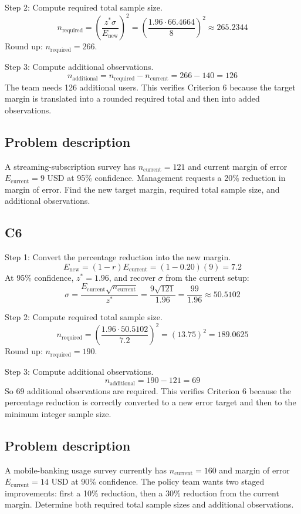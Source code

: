 \begin{ExamProblems}
		Step 2: Compute required total sample size.
		\[
		n_{\text{required}} = \left(\frac{z^*\sigma}{E_{\text{new}}}\right)^2
		= \left(\frac{1.96 \cdot 66.4664}{8}\right)^2
		\approx 265.2344
		\]
		Round up: $n_{\text{required}} = 266$.

		Step 3: Compute additional observations.
		\[
		n_{\text{additional}} = n_{\text{required}} - n_{\text{current}} = 266 - 140 = 126
		\]
		The team needs 126 additional users. This verifies Criterion 6 because the target margin is translated into a rounded required total and then into added observations.

		\item
		\subsection*{Problem description}
		A streaming-subscription survey has $n_{\text{current}} = 121$ and current margin of error $E_{\text{current}} = 9$ USD at 95\% confidence. Management requests a 20\% reduction in margin of error. Find the new target margin, required total sample size, and additional observations.

		\subsection*{C6}
		Step 1: Convert the percentage reduction into the new margin.
		\[
		E_{\text{new}} = (1-r)E_{\text{current}} = (1-0.20)(9) = 7.2
		\]
		At 95\% confidence, $z^* = 1.96$, and recover $\sigma$ from the current setup:
		\[
		\sigma = \frac{E_{\text{current}}\sqrt{n_{\text{current}}}}{z^*}
		= \frac{9\sqrt{121}}{1.96}
		= \frac{99}{1.96}
		\approx 50.5102
		\]

		Step 2: Compute required total sample size.
		\[
		n_{\text{required}} = \left(\frac{1.96 \cdot 50.5102}{7.2}\right)^2
		= \left(13.75\right)^2
		= 189.0625
		\]
		Round up: $n_{\text{required}} = 190$.

		Step 3: Compute additional observations.
		\[
		n_{\text{additional}} = 190 - 121 = 69
		\]
		So 69 additional observations are required. This verifies Criterion 6 because the percentage reduction is correctly converted to a new error target and then to the minimum integer sample size.

		\item
		\subsection*{Problem description}
		A mobile-banking usage survey currently has $n_{\text{current}} = 160$ and margin of error $E_{\text{current}} = 14$ USD at 90\% confidence. The policy team wants two staged improvements: first a 10\% reduction, then a 30\% reduction from the current margin. Determine both required total sample sizes and additional observations.


\end{ExamProblems}
